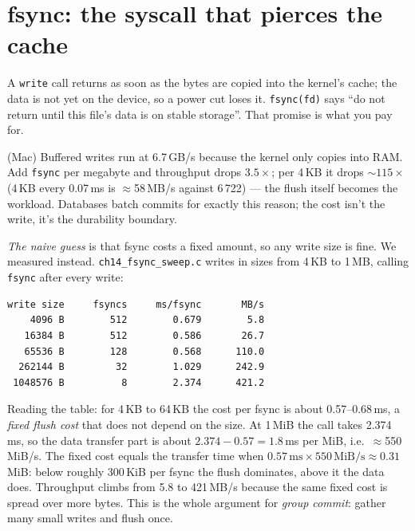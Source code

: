 \section{fsync: the syscall that pierces the cache}
\label{sec:fsync14}



A \texttt{write} call returns as soon as the bytes are copied into
the kernel's cache; the data is not yet on the device, so a power cut
loses it. \texttt{fsync(fd)} says ``do not return until this file's
data is on stable storage''. That promise is what you pay for.

(Mac) Buffered writes run at 6.7\,GB/s because the kernel only copies
into RAM. Add \texttt{fsync} per megabyte and throughput drops
$3.5\times$; per 4\,KB it drops $\sim$$115\times$ (4\,KB every 0.07\,ms is $\approx$58\,MB/s against 6\,722) --- the flush
itself becomes the workload. Databases batch commits for exactly
this reason; the cost isn't the write, it's the durability
boundary.

\begin{example}
\emph{The naive guess} is that fsync costs a fixed amount, so any
write size is fine. We measured instead. \texttt{ch14\_fsync\_}\allowbreak\texttt{sweep.c}
writes in sizes from 4\,KB to 1\,MB, calling \texttt{fsync} after every
write:

\begin{lstlisting}[basicstyle=\ttfamily\scriptsize,caption={Real output of
\texttt{ch14\_fsync\_sweep} (Linux container, one run; a repeat
run gave 2.9 and 10.5\,ms/fsync at 1\,MB on other occasions, so this
disk is noisy).}]
write size     fsyncs     ms/fsync       MB/s
    4096 B        512        0.679        5.8
   16384 B        512        0.586       26.7
   65536 B        128        0.568      110.0
  262144 B         32        1.029      242.9
 1048576 B          8        2.374      421.2
\end{lstlisting}
Reading the table: for 4\,KB to 64\,KB the cost per fsync is about
0.57--0.68\,ms, a \emph{fixed flush cost} that does not depend on the
size. At 1\,MiB the call takes 2.374\,ms, so the data transfer part is
about $2.374-0.57=1.8$\,ms per MiB, i.e.\ $\approx$550\,MiB/s. The
fixed cost equals the transfer time when
$0.57\,\text{ms}\times550\,\text{MiB/s}\approx0.31$\,MiB: below
roughly 300\,KiB per fsync the flush dominates, above it the data
does. Throughput climbs from 5.8 to 421\,MB/s because the same fixed
cost is spread over more bytes. This is the whole argument for
\emph{group commit}: gather many small writes and flush once.
\end{example}

